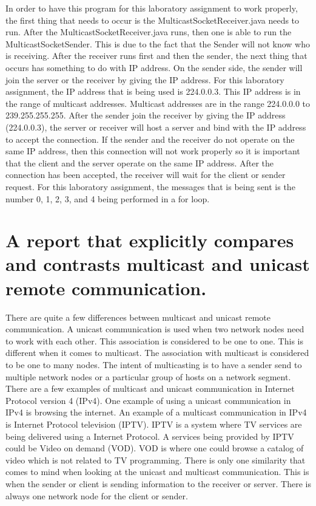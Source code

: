 \documentclass{article}
\begin{document}
In order to have this program for this laboratory assignment to work properly, the first thing that needs to occur is the MulticastSocketReceiver.java needs to run. After the MulticastSocketReceiver.java runs, then one is able to run the MulticastSocketSender. This is due to the fact that the Sender will not know who is receiving. After the receiver runs first and then the sender, the next thing that occurs has something to do with IP address. On the sender side, the sender will join the server or the receiver by giving the IP address. For this laboratory assignment, the IP address that is being used is 224.0.0.3. This IP address is in the range of multicast addresses. Multicast addresses are in the range 224.0.0.0 to 239.255.255.255. After the sender join the receiver by giving the IP address (224.0.0.3), the server or receiver will host a server and bind with the IP address to accept the connection. If the sender and the receiver do not operate on the same IP address, then this connection will not work properly so it is important that the client and the server operate on the same IP address. After the connection has been accepted, the receiver will wait for the client or sender request. For this laboratory assignment, the messages that is being sent is the number 0, 1, 2, 3, and 4 being performed in a for loop.  


\section{A report that explicitly compares and contrasts multicast and unicast remote communication.}

There are quite a few differences between multicast and unicast remote communication. A unicast communication is used when two network nodes need to work with each other. This association is considered to be one to one. This is different when it comes to multicast. The association with multicast is considered to be one to many nodes. The intent of multicasting is to have a sender send to multiple network nodes or a particular group of hosts on a network segment. There are a few examples of multicast and unicast communication in Internet Protocol version 4 (IPv4). One example of using a unicast communication in IPv4 is browsing the internet. An example of a multicast communication in IPv4 is Internet Protocol television (IPTV). IPTV is a system where TV services are being delivered using a Internet Protocol. A services being provided by IPTV could be Video on demand (VOD). VOD is where one could browse a catalog of video which is not related to TV programming. There is only one similarity that comes to mind when looking at the unicast and multicast communication. This is when the sender or client is sending information to the receiver or server. There is always one network node for the client or sender. 
\end{document}
